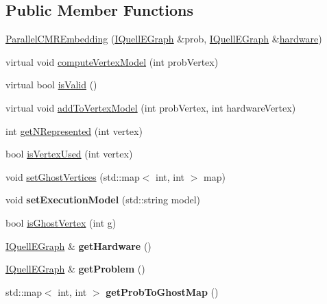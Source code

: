 \subsection*{Public Member Functions}
\begin{DoxyCompactItemize}
\item 
\hyperlink{a00092_a6ab507aaa1e75a180a5f441ae0012b0f}{Parallel\+C\+M\+R\+Embedding} (\hyperlink{a00076}{I\+Quell\+E\+Graph} \&prob, \hyperlink{a00076}{I\+Quell\+E\+Graph} \&\hyperlink{a00050_a511a70c0b460d5baad91794dbc60ab09}{hardware})
\item 
virtual void \hyperlink{a00092_a2d9a99786af28f38134f0243d231bb35}{compute\+Vertex\+Model} (int prob\+Vertex)
\item 
virtual bool \hyperlink{a00092_a74606fda2c0542c2d197146787969bd4}{is\+Valid} ()
\item 
virtual void \hyperlink{a00092_a55ba8c7ae717cbfa8a57503116536344}{add\+To\+Vertex\+Model} (int prob\+Vertex, int hardware\+Vertex)
\item 
int \hyperlink{a00092_a7f18154f9ba79fb4bee03543e75cddb5}{get\+N\+Represented} (int vertex)
\item 
bool \hyperlink{a00092_a70955f1c3534bc9da12c3956b11a7820}{is\+Vertex\+Used} (int vertex)
\item 
void \hyperlink{a00092_a59414001df28a664b1e6da35d297731d}{set\+Ghost\+Vertices} (std\+::map$<$ int, int $>$ map)
\item 
void {\bfseries set\+Execution\+Model} (std\+::string model)\hypertarget{a00092_a9fd83176631007efcd276666f8f36323}{}\label{a00092_a9fd83176631007efcd276666f8f36323}

\item 
bool \hyperlink{a00092_a6fbb695c060ff00be3134c874ff82a6c}{is\+Ghost\+Vertex} (int g)
\item 
\hyperlink{a00076}{I\+Quell\+E\+Graph} \& {\bfseries get\+Hardware} ()\hypertarget{a00092_a8241fc3cd03161d4c7ae946daace1fcd}{}\label{a00092_a8241fc3cd03161d4c7ae946daace1fcd}

\item 
\hyperlink{a00076}{I\+Quell\+E\+Graph} \& {\bfseries get\+Problem} ()\hypertarget{a00092_a6ed60ea935d3c07e5f94001d2174a211}{}\label{a00092_a6ed60ea935d3c07e5f94001d2174a211}

\item 
std\+::map$<$ int, int $>$ {\bfseries get\+Prob\+To\+Ghost\+Map} ()\hypertarget{a00092_a014aaa01072712f879bc8902704597a1}{}\label{a00092_a014aaa01072712f879bc8902704597a1}

\end{DoxyCompactItemize}

